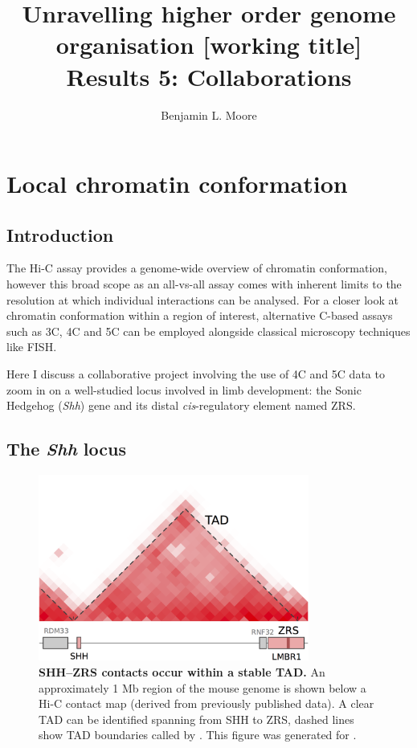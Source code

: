 \documentclass[a4paper,11pt,oneside]{book}
\title{ \vspace{3in} Unravelling higher order genome organisation {\small [working
    title]} \\ \vspace{2em} {\large {\bf Results 5: Collaborations}} }
\author{Benjamin L. Moore}
\begin{document}

\chapter{Local chromatin conformation}\label{chap:shh}

\section{Introduction}

The Hi-C assay provides a genome-wide overview of chromatin conformation, however this broad scope as an all-vs-all assay comes with inherent limits to the resolution at which individual interactions can be analysed. For a closer look at chromatin conformation within a region of interest, alternative C-based assays such as 3C, 4C and 5C can be employed alongside classical microscopy techniques like FISH.

Here I discuss a collaborative project involving the use of 4C and 5C data to zoom in on a well-studied locus involved in limb development: the Sonic Hedgehog (\emph{Shh}) gene and its distal \emph{cis}-regulatory element named ZRS.

\section{The \emph{Shh} locus}

\begin{figure}
\begin{center} 
\includegraphics[width=3.5in]{figs/shhtad.png}
\captionsetup{width=\textwidth} 
\caption[SHH--ZRS contacts occur within a stable TAD.]{ {\bf SHH--ZRS contacts occur within a stable TAD. }
An approximately 1 Mb region of the mouse genome is shown below a Hi-C contact map (derived from previously published data\cite{Dixon2012}). A clear TAD can be identified spanning from SHH to ZRS, dashed lines show TAD boundaries called by \citet{Dixon2012}. This figure was generated for \citet{Anderson2014a}.
}\label{fig:shhtad}
\end{center} 
\end{figure} 
\end{document}

